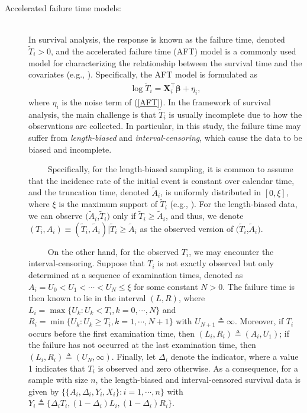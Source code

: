 \begin{description}
\item[Accelerated failure time models:]
\ \\
In survival analysis, the response is {known as} the failure time, denoted $\widetilde{T}_i>0$, and the accelerated failure time (AFT) model is a commonly used {model for  characterizing the relationship between} the survival time and the covariates (e.g., \citealp{Lawless:2003}). Specifically, the AFT model is formulated as
\begin{eqnarray} \label{AFT}
\log \widetilde{T}_i =\mathbf{X}_i^\top \boldsymbol{\beta}+\eta_i,
\end{eqnarray}
where $\eta_i$ is the noise term of (\ref{AFT}). In the framework of survival analysis, the main challenge is that $\widetilde{T}_i$ is usually incomplete due to {how the observations are collected}. In particular, in this study, the failure time may suffer from {\em length-biased} and {\em interval-censoring}, which cause the data to be biased and incomplete. 

{\ \ \ \ } Specifically, for the length-biased sampling, it is common to assume that the incidence rate of the initial event is constant over calendar time,  and the truncation time, denoted $\widetilde{A}_i$, is uniformly distributed in $[0,\xi]$, where $\xi$ is the maximum support of $\widetilde{T}_i$ (e.g., \citealp{ChenQiu:2023}). For the length-biased data, we can observe  $(\widetilde{A}_i$,$\widetilde{T}_i)$ only if $\widetilde{T}_i \geq \widetilde{A}_i$, and thus, we denote $(T_i,A_i) \equiv (\widetilde{T}_i,\widetilde{A}_i) \big| \widetilde{T}_i \geq \widetilde{A}_i$ as the observed version of $(\widetilde{T}_i$,$\widetilde{A}_i)$.

{\ \ \ \ } On the other hand, for the observed $T_i$, {we} may encounter the interval-censoring. Suppose that $T_i$ is not exactly observed but only determined at a sequence of examination times, denoted as
$A_i = U_0 <U_{1} < \cdots < U_{N} \leq  \xi$ for some constant $N>0$. The failure time is then known to lie in the interval $(L,R)$, where $L_i = \max\{U_k : U_k < T_i, k = 0, \cdots ,N\}$ and $R_i = \min\{U_k : U_k \geq T_i, k=1, \cdots ,N+1\}$ with $U_{N+1}\triangleq \infty$. Moreover, if $T_i$ occurs before the first examination time, then $(L_i,R_i) \triangleq (A_i, U_1)$; if the failure has not occurred at the last examination time, then $(L_i,R_i) \triangleq (U_N, \infty)$. Finally, let $\Delta_i$ denote the indicator, where a value 1 indicates that $T_i$ is observed and zero otherwise. {As a consequence}, for a sample with size $n$, the length-biased and interval-censored survival data is given by $ \big\{ \{ A_i, \Delta_i, Y_i, X_i\} : i=1,\cdots,n \big\} $ with $Y_i \triangleq \{\Delta_iT_i, (1-\Delta_i)L_i, (1-\Delta_i)R_i\}$.


\end{description}
